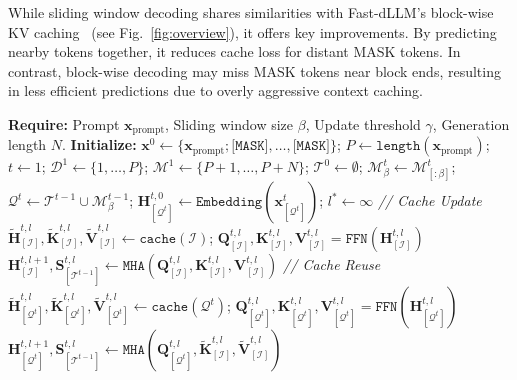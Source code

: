 \documentclass{article} %
\theoremstyle{definition}
\theoremstyle{remark}
\begin{document}
While sliding window decoding shares similarities with Fast-dLLM’s block-wise KV caching~\citep{wu2025fast} (see Fig.~\ref{fig:overview}), it offers key improvements. By predicting nearby tokens together, it reduces cache loss for distant MASK tokens. In contrast, block-wise decoding may miss MASK tokens near block ends, resulting in less efficient predictions due to overly aggressive context caching.

\begin{algorithm*}[t]
\caption{The Elastic-Cache Algorithm}
\begin{algorithmic}[1]
\State \textbf{Require:} Prompt $\mathbf{x}_{\text{prompt}}$, Sliding window size $\beta$, Update threshold $\gamma$, Generation length $N$.
\State \textbf{Initialize:} $\mathbf{x}^0 \leftarrow \{\mathbf{x}_{\text{prompt}}; \texttt{[MASK]}, \dots, \texttt{[MASK]}\}$; \quad $P \leftarrow \texttt{length}(\mathbf{x}_{\text{prompt}})$;
\State $t \leftarrow 1$; \quad $\mathcal{D}^{1} \leftarrow \{1, \dots,P\}$; \quad $\mathcal{M}^1 \leftarrow \{P+1,\dots,P+N\}$; \quad $\mathcal{T}^0 \leftarrow \emptyset $;
    \State $\mathcal{M}^t_\beta \leftarrow \mathcal{M}^t_{[:\beta]}$; \quad $\mathcal{Q}^t \gets \mathcal{T}^{t-1} \cup \mathcal{M}^{t-1}_\beta$; \quad $\mathbf{H}^{t,0}_{[\mathcal{Q}^t]} \leftarrow \texttt{Embedding}(\mathbf{x}^{t}_{[\mathcal{Q}^t]})$; \quad $l^* \gets \infty$
         \hfill \textcolor{updategreen}{\textit{// Cache Update}}
            \State $\mathbf{\tilde H}^{t,l}_{[\mathcal{I}]}, \mathbf{\tilde K}^{t,l}_{[\mathcal{I}]}, \mathbf{\tilde V}^{t,l}_{[\mathcal{I}]} \gets\texttt{cache}(\mathcal{I})$; \quad $\mathbf{Q}^{t,l}_{[\mathcal{I}]}, \mathbf{K}^{t,l}_{[\mathcal{I}]}, \mathbf{V}^{t,l}_{[\mathcal{I}]} = \texttt{FFN}(\mathbf{ H}^{t,l}_{[\mathcal{I}]})$ 
            \State $\mathbf{ H}^{t,l+1}_{[\mathcal{I}]}, \mathbf{S}^{t,l}_{[\mathcal{T}^{t-1}]} \gets \texttt{MHA}(\mathbf{Q}^{t,l}_{[\mathcal{I}]}, \mathbf{K}^{t,l}_{[\mathcal{I}]}, \mathbf{V}^{t,l}_{[\mathcal{I}]})$
        \Else \hfill \textcolor{updategreen}{\textit{// Cache Reuse}}
            \State $\mathbf{\tilde H}^{t,l}_{[\mathcal{Q}^t]}, \mathbf{\tilde K}^{t,l}_{[\mathcal{Q}^t]}, \mathbf{\tilde V}^{t,l}_{[\mathcal{Q}^t]} \gets\texttt{cache}(\mathcal{Q}^t)$; \quad $\mathbf{Q}^{t,l}_{[\mathcal{Q}^t]}, \mathbf{K}^{t,l}_{[\mathcal{Q}^t]}, \mathbf{V}^{t,l}_{[\mathcal{Q}^t]} = \texttt{FFN}(\mathbf{ H}^{t,l}_{[\mathcal{Q}^t]})$ 
            \State $\mathbf{ H}^{t,l+1}_{[\mathcal{Q}^t]}, \mathbf{S}^{t,l}_{[\mathcal{T}^{t-1}]} \gets \texttt{MHA}(\mathbf{Q}^{t,l}_{[\mathcal{Q}^t]}, \mathbf{\tilde K}^{t,l}_{[\mathcal{I}]}, \mathbf{\tilde V}^{t,l}_{[\mathcal{I}]})$

\end{algorithmic}
\end{algorithm*}
\end{document}
